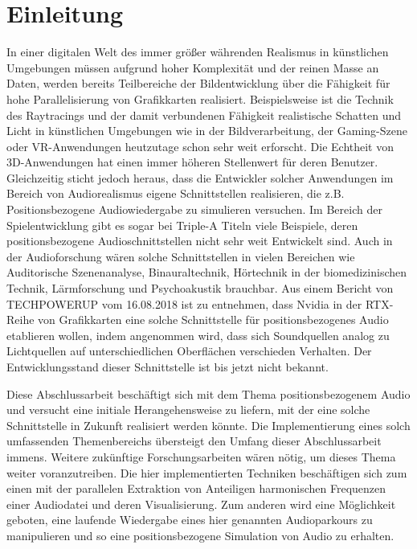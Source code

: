 
\section{Einleitung}

In einer digitalen Welt des immer größer währenden Realismus in künstlichen Umgebungen müssen aufgrund hoher Komplexität und der reinen Masse an Daten, werden bereits Teilbereiche der Bildentwicklung über die Fähigkeit für hohe Parallelisierung von Grafikkarten realisiert. Beispielsweise ist die Technik des Raytracings und der damit verbundenen Fähigkeit realistische Schatten und Licht in künstlichen Umgebungen wie in der Bildverarbeitung, der Gaming-Szene oder VR-Anwendungen heutzutage schon sehr weit erforscht. Die Echtheit von 3D-Anwendungen hat einen immer höheren Stellenwert für deren Benutzer. Gleichzeitig sticht jedoch heraus, dass die Entwickler solcher Anwendungen im Bereich von Audiorealismus eigene Schnittstellen realisieren, die z.B. Positionsbezogene Audiowiedergabe zu simulieren versuchen. Im Bereich der Spielentwicklung gibt es sogar bei Triple-A Titeln viele Beispiele, deren positionsbezogene Audioschnittstellen nicht sehr weit Entwickelt sind. Auch in der Audioforschung wären solche Schnittstellen in vielen Bereichen wie Auditorische Szenenanalyse, Binauraltechnik, Hörtechnik in der biomedizinischen Technik, Lärmforschung und Psychoakustik \cite{rwth_survey_categories} brauchbar. Aus einem Bericht von TECHPOWERUP \cite{atricle_audiotracing} vom 16.08.2018 ist zu entnehmen, dass Nvidia in der RTX-Reihe von Grafikkarten eine solche Schnittstelle für positionsbezogenes Audio etablieren wollen, indem angenommen wird, dass sich Soundquellen analog zu Lichtquellen auf unterschiedlichen Oberflächen verschieden Verhalten. Der Entwicklungsstand dieser Schnittstelle ist bis jetzt nicht bekannt.

Diese Abschlussarbeit beschäftigt sich mit dem Thema positionsbezogenem Audio und versucht eine initiale Herangehensweise zu liefern, mit der eine solche Schnittstelle in Zukunft realisiert werden könnte. Die Implementierung eines solch umfassenden Themenbereichs übersteigt den Umfang dieser Abschlussarbeit immens. Weitere zukünftige Forschungsarbeiten wären nötig, um dieses Thema weiter voranzutreiben. Die hier implementierten Techniken beschäftigen sich zum einen mit der parallelen Extraktion von Anteiligen harmonischen Frequenzen einer Audiodatei und deren Visualisierung. Zum anderen wird eine Möglichkeit geboten, eine laufende Wiedergabe eines hier genannten Audioparkours zu manipulieren und so eine positionsbezogene Simulation von Audio zu erhalten.